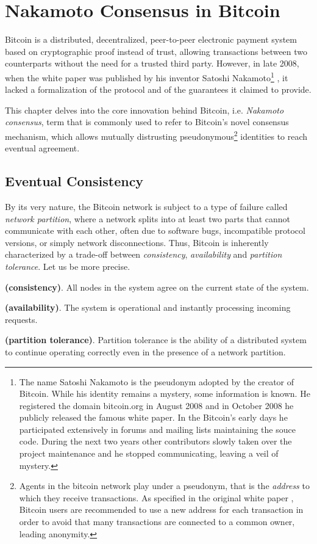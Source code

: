 \chapter{Nakamoto Consensus in Bitcoin}
\label{chpr:btc}
Bitcoin is a distributed, decentralized, peer-to-peer electronic payment system based on cryptographic proof instead of trust, allowing transactions between two counterparts without the need for a trusted third party. However, in late 2008, when the white paper was published by his inventor Satoshi Nakamoto\footnote{The name Satoshi Nakamoto is the pseudonym adopted by the creator of Bitcoin. While his identity remains a mystery, some information is known. He registered the domain bitcoin.org in August 2008 and in October 2008 he publicly released the famous white paper. In the Bitcoin's early days he participated extensively in forums and mailing lists maintaining the souce code. During the next two years other contributors slowly taken over the project maintenance and he stopped communicating, leaving a veil of mystery.} \cite{nakamoto2012bitcoin}, it lacked a formalization of the protocol and of the guarantees it claimed to provide.

\bigskip
\noindent
This chapter delves into the core innovation behind Bitcoin, i.e. \textit{Nakamoto consensus}, term that is commonly used to refer to Bitcoin's novel consensus mechanism, which allows mutually distrusting pseudonymous\footnote{Agents in the bitcoin network play under a pseudonym, that is the \textit{address} to which they receive transactions. As specified in the original white paper \cite{nakamoto2012bitcoin}, Bitcoin users are recommended to use a new address for each transaction in order to avoid that many transactions are connected to a common owner, leading anonymity.} identities to reach eventual agreement.

\bigskip
\section{Eventual Consistency}
\label{sec:eventual-consistency}
By its very nature, the Bitcoin network is subject to a type of failure called \textit{network partition}, where a network splits into at least two parts that cannot communicate with each other, often due to software bugs, incompatible protocol versions, or simply network disconnections.
Thus, Bitcoin is inherently characterized by a trade-off between \textit{consistency}, \textit{availability} and \textit{partition tolerance}. Let us be more precise.
\begin{mydef} {\bf (consistency)}.
    All nodes in the system agree on the current state of the system.
\end{mydef}
\begin{mydef} {\bf (availability)}.
    The system is operational and instantly processing incoming requests.
\end{mydef}
\begin{mydef} {\bf (partition tolerance)}.
    Partition tolerance is the ability of a distributed system to continue operating correctly even in the presence of a network partition.
\end{mydef}

